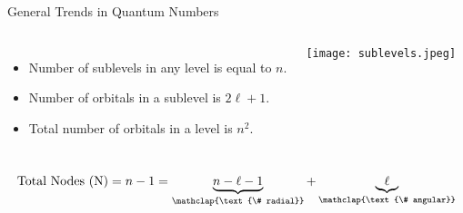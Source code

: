 \documentclass[handout,notes=hide]{beamer}
\begin{document}
\begin{frame}{General Trends in Quantum Numbers}
	\begin{columns}
	\begin{itemize}
		\item Number of sublevels in any level is equal to $n$.
		\item Number of orbitals in a sublevel is $2\ell + 1$.
		\item Total number of orbitals in a level is $n^2$.
	\end{itemize}
	\begin{center}
		\texttt{[image: sublevels.jpeg]}
	\end{center}
	\end{columns}
	\begin{equation*}
		\text{Total Nodes (N)} = n - 1 = \underbrace{n - \ell -
		1}_{\mathclap{\text{\# radial}}} +
		\underbrace{\ell}_{\mathclap{\text{\# angular}}}
	\end{equation*}
\end{frame}

\end{document}
